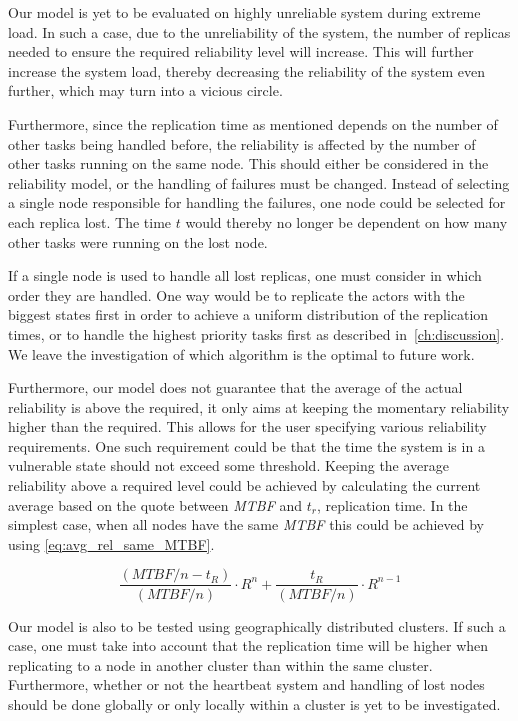 \documentclass{cslthse-msc}
\begin{document}
Our model is yet to be evaluated on highly unreliable system during extreme load. In such a case, due to the unreliability of the system, the number of replicas needed to ensure the required reliability level will increase. This will further increase the system load, thereby decreasing the reliability of the system even further, which may turn into a vicious circle.

Furthermore, since the replication time as mentioned depends on the number of other tasks being handled before, the reliability is affected by the number of other tasks running on the same node. This should either be considered in the reliability model, or the handling of failures must be changed. Instead of selecting a single node responsible for handling the failures, one node could be selected for each replica lost. The time $t$ would thereby no longer be dependent on how many other tasks were running on the lost node.

If a single node is used to handle all lost replicas, one must consider in which order they are handled. One way would be to replicate the actors with the biggest states first in order to achieve a uniform distribution of the replication times, or to handle the highest priority tasks first as described in~\cref{ch:discussion}. We leave the investigation of which algorithm is the optimal to future work. 

Furthermore, our model does not guarantee that the average of the actual reliability is above the required, it only aims at keeping the momentary reliability higher than the required. This allows for the user specifying various reliability requirements. One such requirement could be that the time the system is in a vulnerable state should not exceed some threshold. Keeping the average reliability above a required level could be achieved by calculating the current average based on the quote between \emph{MTBF} and $t_r$, replication time. In the simplest case, when all nodes have the same \emph{MTBF} this could be achieved by using \cref{eq:avg_rel_same_MTBF}.

\begin{equation} \label{eq:avg_rel_same_MTBF}
	\frac{(MTBF/n - t_{R})}{(MTBF/n)} \cdot R^n + \frac{t_{R}}{(MTBF/n)} \cdot R^{n-1}
\end{equation}

Our model is also to be tested using geographically distributed clusters. If such a case, one must take into account that the replication time will be higher when replicating to a node in another cluster than within the same cluster. Furthermore, whether or not the heartbeat system and handling of lost nodes should be done globally or only locally within a cluster is yet to be investigated.
\end{document}
